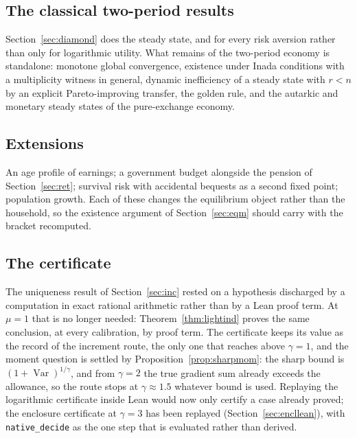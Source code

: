 \subsection{The classical two-period results}

Section~\ref{sec:diamond} does the steady state, and for every risk aversion rather than only for
logarithmic utility. What remains of the two-period economy is standalone: monotone global
convergence, existence under Inada conditions with a multiplicity witness in general, dynamic
inefficiency of a steady state with $r<n$ by an explicit Pareto-improving transfer, the golden rule,
and the autarkic and monetary steady states of the pure-exchange economy.

\subsection{Extensions}

An age profile of earnings; a government budget alongside the pension of Section~\ref{sec:ret};
survival risk with accidental bequests as a second fixed point; population growth. Each of these
changes the equilibrium object rather than the household, so the existence argument of
Section~\ref{sec:eqm} should carry with the bracket recomputed.

\subsection{The certificate}

The uniqueness result of Section~\ref{sec:inc} rested on a hypothesis discharged by a computation in
exact rational arithmetic rather than by a Lean proof term. At $\mu=1$ that is no longer needed:
Theorem~\ref{thm:lightind} proves the same conclusion, at every calibration, by proof term. The
certificate keeps its value as the record of the increment route, the only one that reaches above
$\gamma=1$, and the moment question is settled by Proposition~\ref{prop:sharpmom}: the sharp bound is
$(1+\operatorname{Var})^{1/\gamma}$, and from $\gamma=2$ the true gradient sum already exceeds the
allowance, so the route stops at $\gamma\approx1.5$ whatever bound is used. Replaying the logarithmic
certificate inside Lean would now only certify a case already proved; the enclosure certificate at
$\gamma=3$ has been replayed (Section~\ref{sec:encllean}), with \texttt{native\_decide} as the one
step that is evaluated rather than derived.
